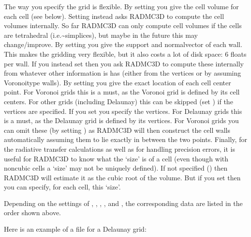 \documentclass[letterpaper,10pt,english]{sphinxmanual}
\begin{document}
The way you specify the grid is flexible. By setting  you
give the cell volume for each cell (see below). Setting instead
 asks RADMC\sphinxhyphen{}3D to compute the cell volumes internally.  So
far RADMC\sphinxhyphen{}3D can only compute cell volumes if the cells are tetrahedral
(i.e.\textasciitilde{}simplices), but maybe in the future this may change/improve.  By setting
 you give the support\sphinxhyphen{} and normal\sphinxhyphen{}vector of each
wall. This makes the gridding very flexible, but it also costs a lot of disk
space: 6 floats per wall. If you instead set  then you ask
RADMC\sphinxhyphen{}3D to compute these internally from whatever other information is has
(either from the vertices or by assuming Voronoi\sphinxhyphen{}type walls).  By setting
 you give the exact location of each cell center
point. For Voronoi grids this is a must, as the Voronoi grid is defined by its
cell centers. For other grids (including Delaunay) this can be skipped (set
) if the vertices are specified.  If you set
 you specify the vertices. For Delaunay grids this is a
must, as the Delaunay grid is defined by its vertices. For Voronoi grids you
can omit these (by setting ) as RADMC\sphinxhyphen{}3D will then construct
the cell walls automatically assuming them to lie exactly in between the two
points. Finally, for the radiative transfer calculations as well as for
handling precision errors, it is useful for RADMC\sphinxhyphen{}3D to know what the
‘size’ is of a cell (even though with non\sphinxhyphen{}cubic cells a ‘size’ may not be
uniquely defined). If not specified () then RADMC\sphinxhyphen{}3D will
estimate it as the cubic root of the volume. But if you set 
then you can specify, for each cell, this ‘size’.

Depending on the settings of , ,
, , and , the corresponding
data are listed in the order shown above.

Here is an example of a  file for a Delaunay grid:
\end{document}
